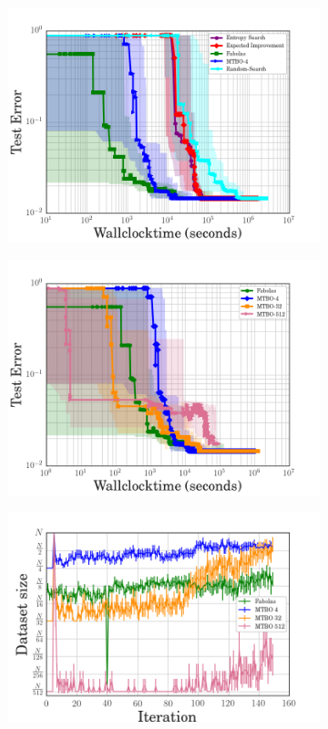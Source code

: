 \begin{figure}
	\begin{subfigure}{0.32\textwidth}
		\centering
		\includegraphics[width=\linewidth]{gfx/fabolas/time1.png}
	\end{subfigure}
	\begin{subfigure}{0.32\textwidth}
		\centering
		\includegraphics[width=\linewidth]{gfx/fabolas/time2.png}
	\end{subfigure}
	\begin{subfigure}{0.34\textwidth}
		\centering
		\includegraphics[width=\linewidth]{gfx/fabolas/size.png}

\end{subfigure}
\end{figure}
